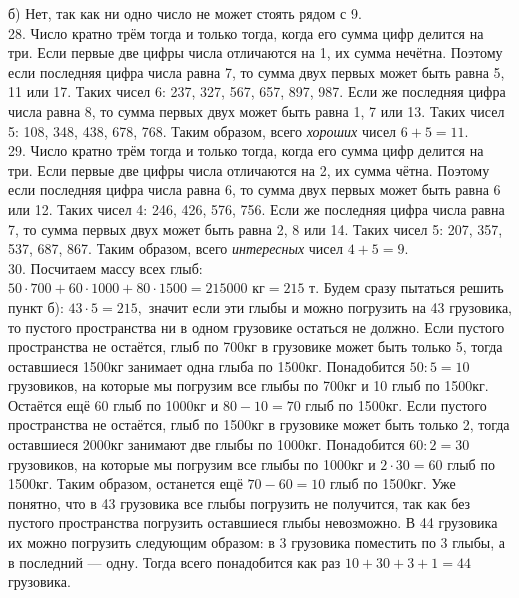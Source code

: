 \documentclass[12pt]{article}
\begin{document}
б) Нет, так как ни одно число не может стоять рядом с 9.\\
28. Число кратно трём тогда и только тогда, когда его сумма цифр делится на три. Если первые две цифры числа отличаются на 1, их сумма нечётна. Поэтому если последняя цифра числа равна 7, то сумма двух первых может быть равна 5, 11 или 17. Таких чисел 6: 237, 327, 567, 657, 897, 987. Если же последняя цифра числа равна 8, то сумма первых двух может быть равна 1, 7 или 13. Таких чисел 5: 108, 348, 438, 678, 768. Таким образом, всего {\it хороших} чисел $6+5=11.$\\
29. Число кратно трём тогда и только тогда, когда его сумма цифр делится на три. Если первые две цифры числа отличаются на 2, их сумма чётна. Поэтому если последняя цифра числа равна 6, то сумма двух первых может быть равна 6 или 12. Таких чисел 4: 246, 426, 576, 756. Если же последняя цифра числа равна 7, то сумма первых двух может быть равна 2, 8 или 14. Таких чисел 5: 207, 357, 537, 687, 867. Таким образом, всего {\it интересных} чисел $4+5=9.$\\
30. Посчитаем массу всех глыб: $50\cdot700+60\cdot1000+80\cdot1500=215000\text{ кг}=215\text{ т}.$ Будем сразу пытаться решить пункт б): $43\cdot5=215,$ значит если эти глыбы и можно погрузить на 43 грузовика, то пустого пространства ни в одном грузовике остаться не должно. Если пустого пространства не остаётся, глыб по 700кг в грузовике может быть только 5, тогда оставшиеся 1500кг занимает одна глыба по 1500кг. Понадобится $50:5=10$ грузовиков, на которые мы погрузим все глыбы по 700кг и 10 глыб по 1500кг. Остаётся ещё 60 глыб по 1000кг и $80-10=70$ глыб по 1500кг. Если пустого пространства не остаётся, глыб по 1500кг в грузовике может быть только 2, тогда оставшиеся 2000кг занимают две глыбы по 1000кг. Понадобится $60:2=30$ грузовиков, на которые мы погрузим все глыбы по 1000кг и $2\cdot30=60$ глыб по 1500кг. Таким образом, останется ещё $70-60=10$ глыб по 1500кг. Уже понятно, что в 43 грузовика все глыбы погрузить не получится, так как без пустого пространства погрузить оставшиеся глыбы невозможно. В 44 грузовика их можно погрузить следующим образом: в 3 грузовика поместить по 3 глыбы, а в последний --- одну. Тогда всего понадобится как раз $10+30+3+1=44$ грузовика.\\
\end{document}
